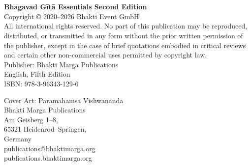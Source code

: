 \chapter{}

\thispagestyle{empty}

\vspace*{\fill}
{\footnotesize
\noindent
\begin{flushleft}
  \textbf{Bhagavad Gītā Essentials Second Edition} \\[1em]

  Copyright © 2020--2026 Bhakti Event GmbH \\[1em]

  All international rights reserved. No part of this publication may be reproduced, distributed, or transmitted in any form without the prior written permission of the publisher, except in the case of brief quotations embodied in critical reviews and certain other non-commercial uses permitted by copyright law. \\[1em]

  Publisher: Bhakti Marga Publications \\[1em]

  English, Fifth Edition \\[1em]

  ISBN: 978-3-96343-129-6 

  Cover Art: Paramahamsa Vishwananda \\[1em]

  Bhakti Marga Publications \\
  Am Geisberg 1–8, \\
  65321 Heidenrod–Springen, \\
  Germany \\[1em]

  publications@bhaktimarga.org \\
  publications.bhaktimarga.org
\end{flushleft}
}